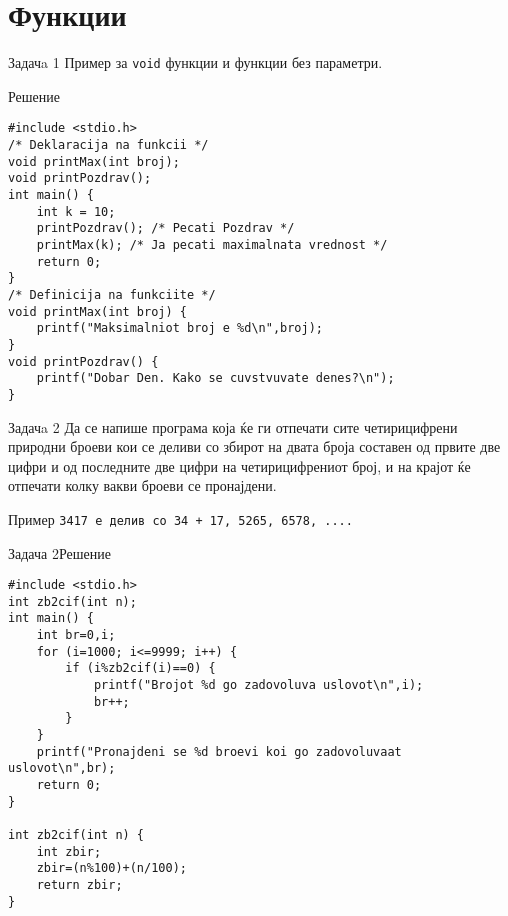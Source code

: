 \section{Функции}

\begin{frame}[fragile]{Задачa 1}
Пример за \texttt{void} функции и функции без параметри.
\pause
\begin{exampleblock}{Решение}
    \begin{lstlisting}
#include <stdio.h>
/* Deklaracija na funkcii */
void printMax(int broj);
void printPozdrav();
int main() {
    int k = 10;
    printPozdrav(); /* Pecati Pozdrav */
    printMax(k); /* Ja pecati maximalnata vrednost */
    return 0;
}
/* Definicija na funkciite */
void printMax(int broj) {
    printf("Maksimalniot broj e %d\n",broj);
}
void printPozdrav() {
    printf("Dobar Den. Kako se cuvstvuvate denes?\n");
}
\end{lstlisting}
\end{exampleblock}
\end{frame}


\begin{frame}[fragile]{Задачa 2}
Да се напише програма која ќе ги отпечати сите четирицифрени природни броеви кои се деливи со збирот на двата броја 
составен од првите две цифри и од последните две цифри на четирицифрениот број,
и на крајот ќе отпечати колку вакви броеви се пронајдени.\\
\begin{exampleblock}{Пример}
\texttt{3417 е делив со 34 + 17, 5265, 6578, ....}\\
\end{exampleblock}
\end{frame}

\begin{frame}[fragile]{Задача 2}{Решение}
\begin{lstlisting}
#include <stdio.h>
int zb2cif(int n);
int main() {
    int br=0,i;
    for (i=1000; i<=9999; i++) {
        if (i%zb2cif(i)==0) {
            printf("Brojot %d go zadovoluva uslovot\n",i);
            br++;
        }
    }
    printf("Pronajdeni se %d broevi koi go zadovoluvaat uslovot\n",br);
    return 0;
}

int zb2cif(int n) {
    int zbir;
    zbir=(n%100)+(n/100);
    return zbir;
}
\end{lstlisting}
\end{frame}

